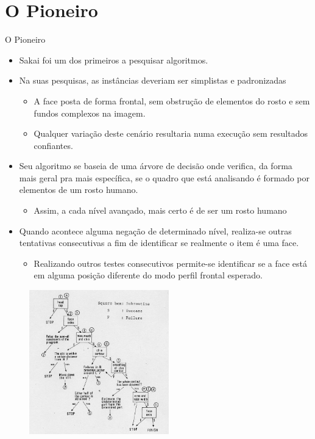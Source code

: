 \documentclass[aspectratio=169, xcolor=dvipsnames]{beamer}
\let\olditem=\item%
\renewcommand{\item}{\olditem \justifying}
\begin{document}
\section{O Pioneiro}
\begin{frame}{O Pioneiro}
	\begin{itemize}
		\setlength{\itemsep}{1.5em}
		\item Sakai \cite{sakai1972computer} foi um dos primeiros a pesquisar algoritmos. 
		
		\item Na suas pesquisas, as instâncias deveriam ser simplistas e padronizadas
		\begin{itemize}
			\item A face posta de forma frontal, sem obstrução de elementos do rosto e sem fundos complexos na imagem.
			\item Qualquer variação deste cenário resultaria numa execução sem resultados confiantes.
		\end{itemize}
		
		\item Seu algoritmo se baseia de uma árvore de decisão onde verifica, da forma mais geral pra mais específica, se o quadro que está analisando é formado por elementos de um rosto humano. 
		\begin{itemize}
			\item Assim, a cada nível avançado, mais certo é de ser um rosto humano
		\end{itemize}
		
		\item Quando acontece alguma negação de determinado nível, realiza-se outras tentativas consecutivas a fim de identificar se realmente o item é uma face.
		\begin{itemize}
			\item Realizando outros testes consecutivos permite-se identificar se a face está em alguma posição diferente do modo perfil frontal esperado.
		\end{itemize}
	\end{itemize}
\end{frame}

\begin{figure}
	\centering
	\includegraphics[width=0.54\textwidth]{img/sakai.png}
\end{figure}
\end{document}
